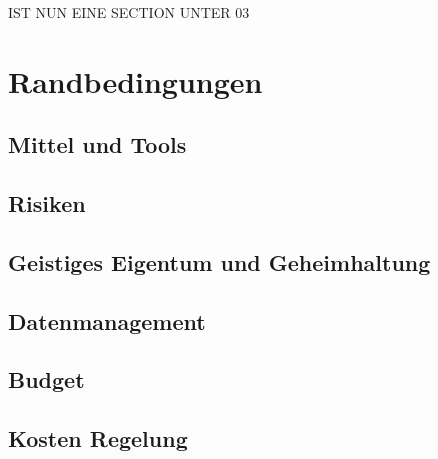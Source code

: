 IST NUN EINE SECTION UNTER 03
\chapter{Randbedingungen}

\section{Mittel und Tools}
\section{Risiken}
\section{Geistiges Eigentum und Geheimhaltung}
\section{Datenmanagement}
\section{Budget}
\section{Kosten Regelung}
